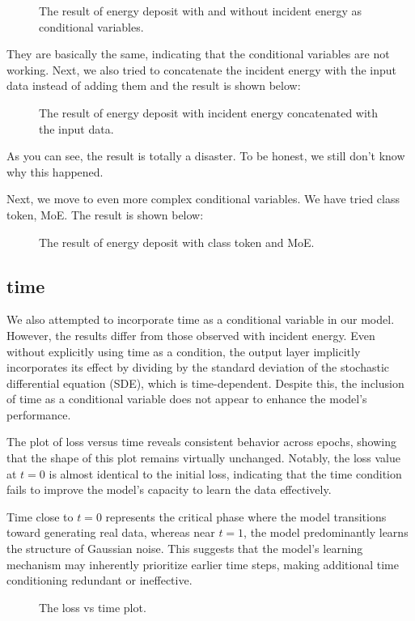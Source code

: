 \begin{figure}[ht]
    \centering
    \caption{The result of energy deposit with and without incident energy as conditional variables.}
\end{figure}

They are basically the same, indicating that the conditional variables are not working. Next, we also tried to concatenate the incident energy with the input data instead of adding them and the result is shown below:

\begin{figure}[ht]
    \centering
    \caption{The result of energy deposit with incident energy concatenated with the input data.}
\end{figure}

As you can see, the result is totally a disaster. To be honest, we still don't know why this happened. 

Next, we move to even more complex conditional variables. We have tried class token, MoE. The result is shown below:

\begin{figure}[ht]
    \centering
    \caption{The result of energy deposit with class token and MoE.}
\end{figure}

\subsection{time}

We also attempted to incorporate time as a conditional variable in our model. However, the results differ from those observed with incident energy. Even without explicitly using time as a condition, the output layer implicitly incorporates its effect by dividing by the standard deviation of the stochastic differential equation (SDE), which is time-dependent. Despite this, the inclusion of time as a conditional variable does not appear to enhance the model's performance.

The plot of loss versus time reveals consistent behavior across epochs, showing that the shape of this plot remains virtually unchanged. Notably, the loss value at $t = 0$ is almost identical to the initial loss, indicating that the time condition fails to improve the model's capacity to learn the data effectively.

Time close to $t = 0$ represents the critical phase where the model transitions toward generating real data, whereas near $t = 1$, the model predominantly learns the structure of Gaussian noise. This suggests that the model's learning mechanism may inherently prioritize earlier time steps, making additional time conditioning redundant or ineffective.

\begin{figure}[ht]
    \centering
    \caption{The loss vs time plot.}
\end{figure}





